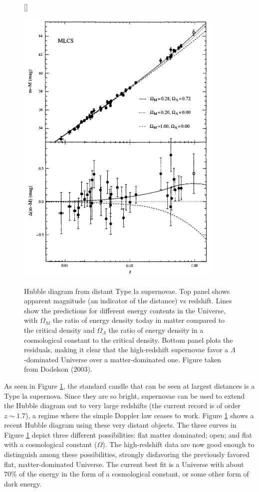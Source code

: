 \documentclass[a4paper,11pt]{article}
\begin{document}
\begin{figure}[h]
    [\FBwidth]
    {\caption{\footnotesize{Hubble diagram from distant Type la supernovae. Top panel shows apparent magnitude (an indicator of the distance) vs redshift. Lines show the predictions for different energy contents in the Universe, with $\Omega_M$ the ratio of energy density today in matter compared to the critical density and $\Omega_\Lambda$ the ratio of energy density in a cosmological constant to the critical density. Bottom panel plots the residuals, making it clear that the high-redshift supernovae favor a $\Lambda$-dominated Universe over a matter-dominated one. Figure taken from Dodelson (2003).}}
    \label{fig:hubblediagram_modern}}
    {\includegraphics[width=10cm]{figures/HubbleDiagram_modern.png}}
\end{figure}

{\noindent}As seen in Figure \ref{fig:hubblediagram_modern}, the standard candle that can be seen at largest distances is a Type la supernova. Since they are so bright, supernovae can be used to extend the Hubble diagram out to very large redshifts (the current record is of order $z\sim1.7$), a regime where the simple Doppler law ceases to work. Figure \ref{fig:hubblediagram_modern} shows a recent Hubble diagram using these very distant objects. The three curves in Figure \ref{fig:hubblediagram_modern} depict three different possibilities: flat matter dominated; open; and flat with a cosmological constant ($\Omega$). The high-redshift data are now good enough to distinguish among these possibilities, strongly disfavoring the previously favored flat, matter-dominated Universe. The current best fit is a Universe with about 70\% of the energy in the form of a cosmological constant, or some other form of dark energy.
\end{document}
